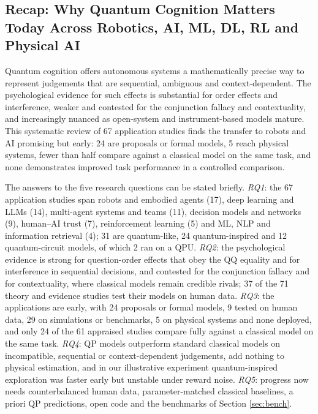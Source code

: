 \documentclass[pdflatex,sn-basic]{sn-jnl}
\begin{document}
\subsection{Recap: Why Quantum Cognition Matters Today Across Robotics, AI, ML, DL, RL and Physical AI}
Quantum cognition offers autonomous systems a mathematically precise way to represent judgements that are sequential, ambiguous and context-dependent. The psychological evidence for such effects is substantial for order effects and interference, weaker and contested for the conjunction fallacy and contextuality, and increasingly nuanced as open-system and instrument-based models mature. This systematic review of 67 application studies finds the transfer to robots and AI promising but early: 24 are proposals or formal models, 5 reach physical systems, fewer than half compare against a classical model on the same task, and none demonstrates improved task performance in a controlled comparison.

The answers to the five research questions can be stated briefly. \emph{RQ1}: the 67 application studies span robots and embodied agents (17), deep learning and LLMs (14), multi-agent systems and teams (11), decision models and networks (9), human--AI trust (7), reinforcement learning (5) and ML, NLP and information retrieval (4); 31 are quantum-like, 24 quantum-inspired and 12 quantum-circuit models, of which 2 ran on a QPU. \emph{RQ2}: the psychological evidence is strong for question-order effects that obey the QQ equality and for interference in sequential decisions, and contested for the conjunction fallacy and for contextuality, where classical models remain credible rivals; 37 of the 71 theory and evidence studies test their models on human data. \emph{RQ3}: the applications are early, with 24 proposals or formal models, 9 tested on human data, 29 on simulations or benchmarks, 5 on physical systems and none deployed, and only 24 of the 61 appraised studies compare fully against a classical model on the same task. \emph{RQ4}: QP models outperform standard classical models on incompatible, sequential or context-dependent judgements, add nothing to physical estimation, and in our illustrative experiment quantum-inspired exploration was faster early but unstable under reward noise. \emph{RQ5}: progress now needs counterbalanced human data, parameter-matched classical baselines, a priori QP predictions, open code and the benchmarks of Section \ref{sec:bench}.
\end{document}
